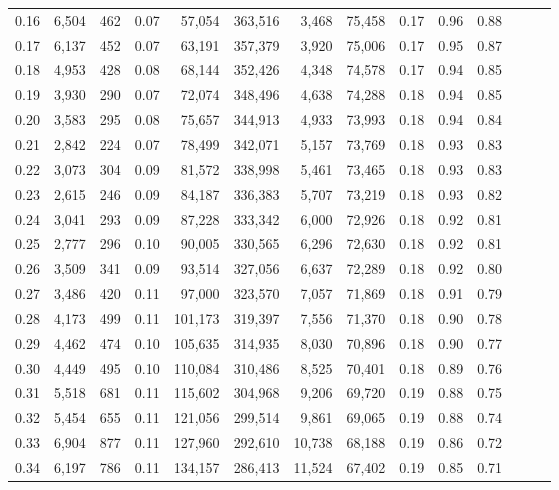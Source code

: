 \begin{tabular}{rrrrrrrrrrrrrr}
0.16 &  6,504 &    462 &  0.07 &   57,054 &  363,516 &   3,468 &  75,458 &  0.17 &  0.96 &      0.88 \\
0.17 &  6,137 &    452 &  0.07 &   63,191 &  357,379 &   3,920 &  75,006 &  0.17 &  0.95 &      0.87 \\
0.18 &  4,953 &    428 &  0.08 &   68,144 &  352,426 &   4,348 &  74,578 &  0.17 &  0.94 &      0.85 \\
0.19 &  3,930 &    290 &  0.07 &   72,074 &  348,496 &   4,638 &  74,288 &  0.18 &  0.94 &      0.85 \\
0.20 &  3,583 &    295 &  0.08 &   75,657 &  344,913 &   4,933 &  73,993 &  0.18 &  0.94 &      0.84 \\
0.21 &  2,842 &    224 &  0.07 &   78,499 &  342,071 &   5,157 &  73,769 &  0.18 &  0.93 &      0.83 \\
0.22 &  3,073 &    304 &  0.09 &   81,572 &  338,998 &   5,461 &  73,465 &  0.18 &  0.93 &      0.83 \\
0.23 &  2,615 &    246 &  0.09 &   84,187 &  336,383 &   5,707 &  73,219 &  0.18 &  0.93 &      0.82 \\
0.24 &  3,041 &    293 &  0.09 &   87,228 &  333,342 &   6,000 &  72,926 &  0.18 &  0.92 &      0.81 \\
0.25 &  2,777 &    296 &  0.10 &   90,005 &  330,565 &   6,296 &  72,630 &  0.18 &  0.92 &      0.81 \\
0.26 &  3,509 &    341 &  0.09 &   93,514 &  327,056 &   6,637 &  72,289 &  0.18 &  0.92 &      0.80 \\
0.27 &  3,486 &    420 &  0.11 &   97,000 &  323,570 &   7,057 &  71,869 &  0.18 &  0.91 &      0.79 \\
0.28 &  4,173 &    499 &  0.11 &  101,173 &  319,397 &   7,556 &  71,370 &  0.18 &  0.90 &      0.78 \\
0.29 &  4,462 &    474 &  0.10 &  105,635 &  314,935 &   8,030 &  70,896 &  0.18 &  0.90 &      0.77 \\
0.30 &  4,449 &    495 &  0.10 &  110,084 &  310,486 &   8,525 &  70,401 &  0.18 &  0.89 &      0.76 \\
0.31 &  5,518 &    681 &  0.11 &  115,602 &  304,968 &   9,206 &  69,720 &  0.19 &  0.88 &      0.75 \\
0.32 &  5,454 &    655 &  0.11 &  121,056 &  299,514 &   9,861 &  69,065 &  0.19 &  0.88 &      0.74 \\
0.33 &  6,904 &    877 &  0.11 &  127,960 &  292,610 &  10,738 &  68,188 &  0.19 &  0.86 &      0.72 \\
0.34 &  6,197 &    786 &  0.11 &  134,157 &  286,413 &  11,524 &  67,402 &  0.19 &  0.85 &      0.71 \\

\end{tabular}

